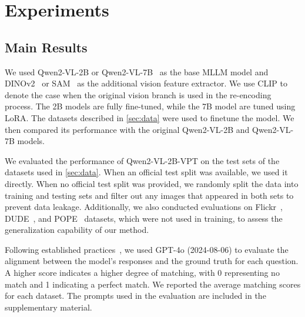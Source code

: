 
\section{Experiments}
\subsection{Main Results}

We used Qwen2-VL-2B or Qwen2-VL-7B~\cite{Qwen2VL} as the base MLLM model and DINOv2~\cite{oquab2024dinov} or SAM~\cite{sam} as the additional vision feature extractor. We use CLIP to denote the case when the original vision branch is used in the re-encoding process. The 2B models are fully fine-tuned, while the 7B model are tuned using LoRA.
The datasets described in \cref{sec:data} were used to finetune the model. 
We then compared its performance with the original Qwen2-VL-2B and Qwen2-VL-7B models.

We evaluated the performance of Qwen2-VL-2B-VPT on the test sets of the datasets used in \cref{sec:data}. When an official test split was available, we used it directly. When no official test split was provided, we randomly split the data into training and testing sets and filter out any images that appeared in both sets to prevent data leakage. Additionally, we also conducted evaluations on Flickr~\cite{flickr}, DUDE~\cite{dude}, and POPE~\cite{pope} datasets, which were not used in training, to assess the generalization capability of our method. 

Following established practices~\cite{mmvet,llava15}, we used GPT-4o (2024-08-06) to evaluate the alignment between the model's responses and the ground truth for each question. A higher score indicates a higher degree of matching, with 0 representing no match and 1 indicating a perfect match. We reported the average matching scores for each dataset. The prompts used in the evaluation are included in the supplementary material.


